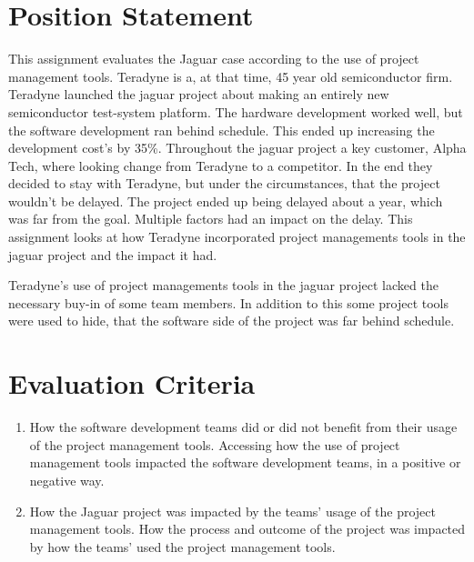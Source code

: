 \section{Position Statement}

This assignment evaluates the Jaguar case according to the use of project management tools. Teradyne is a, at that time, 45 year old semiconductor firm. Teradyne launched the jaguar project about making an entirely new semiconductor test-system platform. The hardware development worked well, but the software development ran behind schedule. This ended up increasing the development cost's by 35\%. Throughout the jaguar project a key customer, Alpha Tech, where looking change from Teradyne to a competitor. In the end they decided to stay with Teradyne, but under the circumstances, that the project wouldn't be delayed. The project ended up being delayed about a year, which was far from the goal. Multiple factors had an impact on the delay. This assignment looks at how Teradyne incorporated project managements tools in the jaguar project and the impact it had.



Teradyne's use of project managements tools in the jaguar project lacked the necessary buy-in of some team members. In addition to this some project tools were used to hide, that the software side of the project was far behind schedule.

\section{Evaluation Criteria}

\begin{enumerate}
    \item How the software development teams did or did not benefit from their usage of the project management tools.
    \subitem Accessing how the use of project management tools impacted the software development teams, in a positive or negative way.
    
    \item How the Jaguar project was impacted by the teams' usage of the project management tools.
    \subitem How the process and outcome of the project was impacted by how the teams' used the project management tools.
\end{enumerate}



